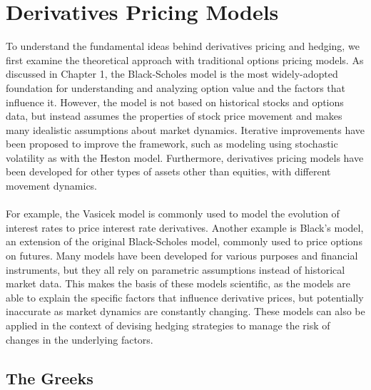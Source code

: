 \section{Derivatives Pricing Models}
To understand the fundamental ideas behind derivatives pricing and hedging, we first examine the theoretical approach with traditional options pricing models. As discussed in Chapter 1, the Black-Scholes model is the most widely-adopted foundation for understanding and analyzing option value and the factors that influence it. However, the model is not based on historical stocks and options data, but instead assumes the properties of stock price movement and makes many idealistic assumptions about market dynamics. Iterative improvements have been proposed to improve the framework, such as modeling using stochastic volatility as with the Heston model. Furthermore, derivatives pricing models have been developed for other types of assets other than equities, with different movement dynamics. 
\\ \\
For example, the Vasicek model is commonly used to model the evolution of interest rates to price interest rate derivatives. Another example is Black's model, an extension of the original Black-Scholes model, commonly used to price options on futures. Many models have been developed for various purposes and financial instruments, but they all rely on parametric assumptions instead of historical market data. This makes the basis of these models scientific, as the models are able to explain the specific factors that influence derivative prices, but potentially inaccurate as market dynamics are constantly changing. These models can also be applied in the context of devising hedging strategies to manage the risk of changes in the underlying factors.

\subsection{The Greeks}

